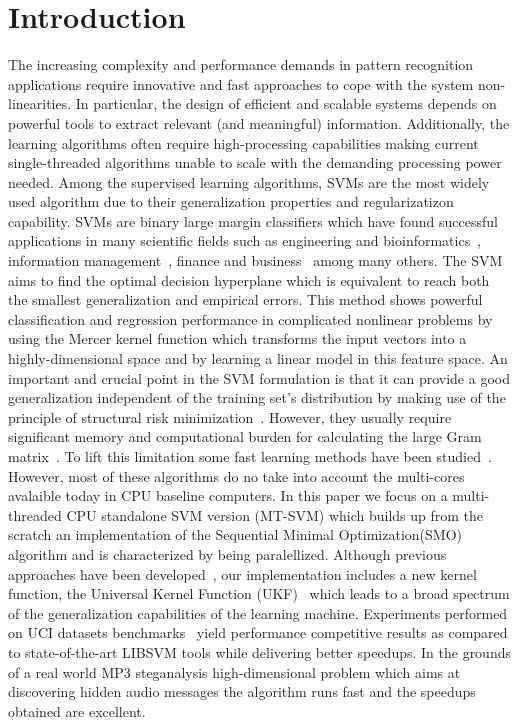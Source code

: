 \documentclass{llncs}
\begin{document}
\section{Introduction}
The increasing complexity and performance demands in pattern recognition applications require innovative and fast approaches to cope with the system non-linearities.  In particular, the design  of efficient and scalable systems depends on powerful tools  to extract relevant (and meaningful) information.   Additionally, the learning algorithms often require high-processing capabilities  making current single-threaded algorithms  unable to scale with the demanding processing power needed. Among the supervised learning algorithms, \acp{SVM} are the most widely used algorithm due to their generalization properties and regularizatizon capability. \acp{SVM} are binary large margin classifiers which have found successful applications in many scientific fields such as engineering and bioinformatics~\cite{ZieRaeMikSchLenMue00}, information management~\cite{Ando2005}, finance and business~\cite{Wu2010} among many others.   
The \ac{SVM} aims to find the optimal decision hyperplane which is equivalent  to reach both the smallest generalization and empirical errors. This method shows powerful classification and regression performance in complicated nonlinear problems by using the Mercer kernel function which transforms the input vectors into a highly-dimensional space and by learning a linear  model in this feature space.  
An important and crucial point in the \ac{SVM} formulation is that it can provide a good generalization independent of the training set's distribution by making use of the principle of structural risk minimization~\cite{Vapnik1995,CorVap95}.
However, they usually require significant memory and computational burden for calculating the large Gram matrix~\cite{Chen2012}. To lift this limitation some fast learning methods have been studied~\cite{Suykens2010,Suykens2005}. However, most of these algorithms do no take into account the multi-cores avalaible today in CPU baseline computers.
In this paper we focus on a multi-threaded CPU  standalone SVM version (MT-SVM)  which builds up from the scratch an implementation of the Sequential Minimal Optimization(SMO) algorithm and is characterized by being paralellized.  
Although previous approaches have been developed~\cite{Catanzaro2008}, our implementation includes a new kernel function, the Universal Kernel Function (UKF)~\cite{Rui2011} which leads to a broad spectrum of the generalization capabilities of the learning machine. Experiments performed on UCI datasets benchmarks~\cite{Asuncion2010} yield performance competitive results as compared to state-of-the-art LIBSVM tools while delivering  better speedups. In the grounds of a real world MP3 steganalysis high-dimensional problem which aims at discovering hidden audio messages the algorithm runs fast and the speedups obtained are excellent.  %
\end{document}
